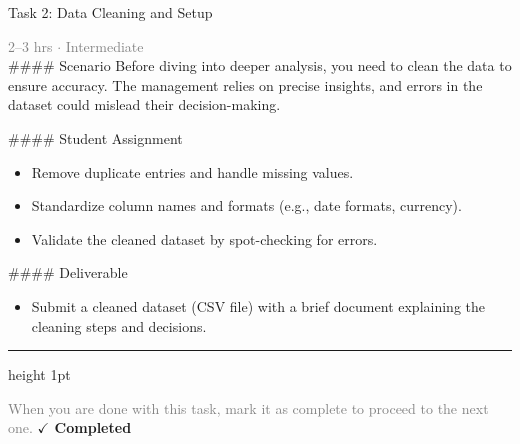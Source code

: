 \documentclass[10pt,a4paper]{article}
\begin{document}
\begin{taskbox}{Task 2: Data Cleaning and Setup}

    {\small \textcolor{gray}{2--3 hrs $\cdot$ Intermediate}}\\[12pt]

    \#\#\#\# Scenario  
Before diving into deeper analysis, you need to clean the data to ensure accuracy. The management relies on precise insights, and errors in the dataset could mislead their decision-making.  

\#\#\#\# Student Assignment  
\begin{itemize}
    \item Remove duplicate entries and handle missing values.  
    \item Standardize column names and formats (e.g., date formats, currency).  
    \item Validate the cleaned dataset by spot-checking for errors.  
\end{itemize}

\#\#\#\# Deliverable  
\begin{itemize}
    \item Submit a cleaned dataset (CSV file) with a brief document explaining the cleaning steps and decisions.\par
\end{itemize}

    \vspace{16pt}

    \textcolor{cardBorder}{\hrule height 1pt}\vspace{8pt}

    \small \textcolor{gray}{When you are done with this task, mark it as complete to proceed to the next one.} \hfill \textbf{\textcolor{brandDark}{$\checkmark$ Completed}}

\end{taskbox}
\end{document}
